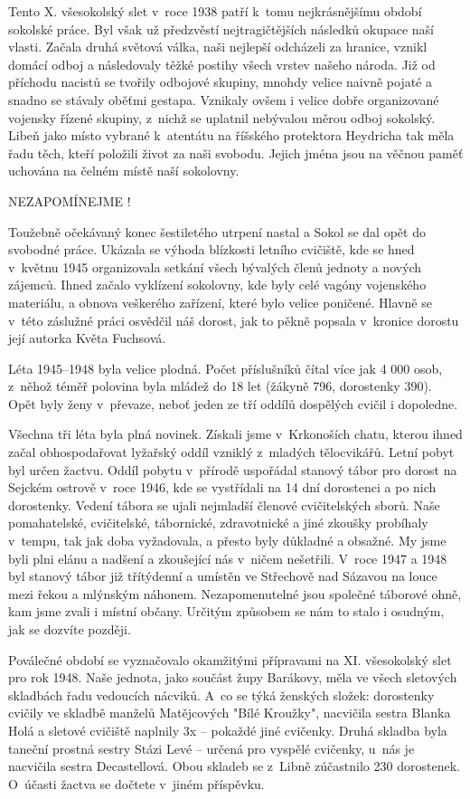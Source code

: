 \documentclass[a5paper, 12pt, twoside]{article}
\begin{document}
Tento X. všesokolský slet v~roce 1938 patří k~tomu nejkrásnějšímu období
sokolské práce. Byl však už předzvěstí nejtragičtějších následků okupace
naší vlasti. Začala druhá světová válka, naši nejlepší odcházeli za
hranice, vznikl domácí odboj a následovaly těžké postihy všech vrstev
našeho národa. Již od příchodu nacistů se tvořily odbojové skupiny,
mnohdy velice naivně pojaté a snadno se stávaly oběťmi gestapa. Vznikaly
ovšem i velice dobře organizované vojensky řízené skupiny, z~nichž se
uplatnil nebývalou měrou odboj sokolský. Libeň jako místo vybrané
k~atentátu na říšského protektora Heydricha tak měla řadu těch, kteří
položili život za naši svobodu. Jejich jména jsou na věčnou paměť
uchována na čelném místě naší sokolovny.

NEZAPOMÍNEJME !

Toužebně očekávaný konec šestiletého utrpení nastal a Sokol se dal opět
do svobodné práce. Ukázala se výhoda blízkosti letního cvičiště, kde se
hned v~květnu 1945 organizovala setkání všech bývalých členů jednoty a
nových zájemců. Ihned začalo vyklízení sokolovny, kde byly celé vagóny
vojenského materiálu, a obnova veškerého zařízení, které bylo velice
poničené. Hlavně se v~této záslužné práci osvědčil náš dorost, jak to
pěkně popsala v~kronice dorostu její autorka Květa Fuchsová.

Léta 1945--1948 byla velice plodná. Počet příslušníků čítal
více jak 4 000 osob, z~něhož téměř polovina byla mládež do 18 let
(žákyně 796, dorostenky 390). Opět byly ženy v~převaze, neboť jeden ze
tří oddílů dospělých cvičil i dopoledne.

Všechna tři léta byla plná novinek. Získali jsme v~Krkonoších chatu,
kterou ihned začal obhospodařovat lyžařský oddíl vzniklý z~mladých
tělocvikářů. Letní pobyt byl určen žactvu. Oddíl pobytu v~přírodě
uspořádal stanový tábor pro dorost na Sejckém ostrově v~roce 1946, kde
se vystřídali na 14 dní dorostenci a po nich dorostenky. Vedení tábora
se ujali nejmladší členové cvičitelských sborů. Naše pomahatelské,
cvičitelské, tábornické, zdravotnické a jiné zkoušky probíhaly v~tempu,
tak jak doba vyžadovala, a přesto byly důkladné a obsažné. My jsme byli
plni elánu a nadšení a zkoušející nás v~ničem nešetřili. V~roce 1947 a
1948 byl stanový tábor již třítýdenní a umístěn ve Střechově nad Sázavou
na louce mezi řekou a mlýnským náhonem. Nezapomenutelné jsou společné
táborové ohně, kam jsme zvali i místní občany. Určitým způsobem se nám
to stalo i osudným, jak se dozvíte později.

Poválečné období se vyznačovalo okamžitými přípravami na XI. všesokolský
slet pro rok 1948. Naše jednota, jako součást župy Barákovy, měla ve
všech sletových skladbách řadu vedoucích nácviků. A~co se týká ženských
složek: dorostenky cvičily ve skladbě manželů Matějcových "Bílé
Kroužky", nacvičila sestra Blanka Holá a sletové cvičiště naplnily 3x
-- pokaždé jiné cvičenky. Druhá skladba byla taneční prostná sestry
Stázi Levé -- určená pro vyspělé cvičenky, u~nás je nacvičila sestra
Decastellová. Obou skladeb se z~Libně zúčastnilo 230 dorostenek.
O~účasti žactva se dočtete v~jiném příspěvku.
\end{document}
